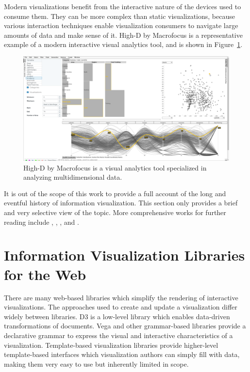Modern visualizations benefit from the interactive nature of the
devices used to consume them. They can be more complex than static
visualizations, because various interaction techniques enable
visualization consumers to navigate large amounts of data and make
sense of it. High-D by Macrofocus \parencite{HighD} is a
representative example of a modern interactive visual analytics tool,
and is shown in Figure~\ref{fig:HighD}.

\begin{figure}[tp]
\centering
\includegraphics[keepaspectratio,width=\linewidth,height=\thirdh]
{images/high-d.png}
\caption[High-D]{
High-D by Macrofocus is a visual analytics tool
specialized in analyzing multidimensional data.
}
\label{fig:HighD}
\end{figure}




It is out of the scope of this work to provide a full account of the
long and eventful history of information visualization. This section
only provides a brief and very selective view of the topic. More
comprehensive works for further reading include
\textcite{BriefHistoryOfDataVis}, \textcite{Meirelles-2013},
\textcite{HistoryOfInformationGraphics}, and
\textcite{HistoryOfDataVisAndGraphicCommunication}.










\section{Information Visualization Libraries for the Web}

There are many web-based libraries which simplify the rendering of
interactive visualizations. The approaches used to create and update a
visualization differ widely between libraries. D3 is a low-level
library which enables data-driven transformations of documents. Vega
and other grammar-based libraries provide a declarative grammar to
express the visual and interactive characteristics of a visualization.
Template-based visualization libraries provide higher-level
template-based interfaces which visualization authors can simply fill
with data, making them very easy to use but inherently limited in
scope.



